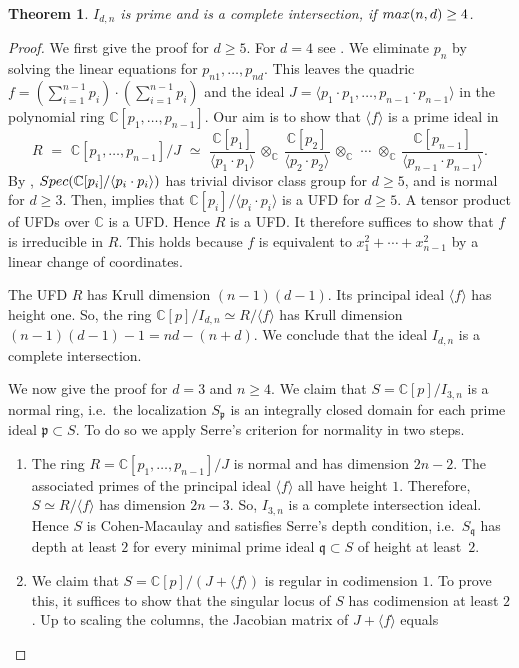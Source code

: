 \documentclass[english]{ourlematema}
\newtheorem{theorem}{Theorem}
\numberwithin{theorem}{section}
\theoremstyle{definition}
\newcommand{\CC}{\mathbb{C}}
\begin{document}
\begin{theorem} \label{thm:parameters}
$I_{d,n}$ is prime and is a complete intersection, if ${\rm max}(n,d) \ge 4$.
\end{theorem}


\begin{proof}
We first give the proof for $d \geq 5$. For $d=4$
see \cite[Theorem 4.5]{EPS}. We eliminate $p_n$ by solving the linear equations for
$p_{n1},\ldots,p_{nd}$. This leaves the quadric 
$f = (\sum_{i=1}^{n-1} p_i) \cdot (\sum_{i=1}^{n-1} p_i)$ and the ideal
$J = \langle p_1 \cdot p_1 ,\ldots, p_{n-1}\cdot p_{n-1}\rangle$
in the polynomial ring $\CC[p_1,\ldots,p_{n-1}]$.
Our aim is to show that  $\langle f \rangle$ is a prime ideal in
$$ R \,\,=\,\, \CC[p_1,\ldots,p_{n-1}]/J \,\, \simeq \,\,
\frac{\CC[p_1]}{\langle p_1\cdot p_1\rangle }\,\otimes_\CC\,  \frac{\CC[p_2]}{\langle p_2\cdot p_2 \rangle}
\,\otimes_\CC\, \,\cdots\, \, \otimes_\CC \,
\frac{\CC[p_{n-1}]}{\langle p_{n-1}\cdot p_{n-1} \rangle}.
$$
By \cite[Exercise II.6.5]{Har}, 
$ {\rm Spec}( \CC[p_i]/\langle p_i \cdot p_i \rangle ) $
has trivial divisor class group  for $d \geq 5$, and  is normal for
 $ d \geq 3$. Then, \cite[Proposition II.6.2]{Har} implies  that
$\CC[p_i]/\langle p_i \cdot p_i \rangle $
 is a UFD for $d \geq 5$.  A tensor product of UFDs over $\CC$ is a UFD. Hence
 $R$ is a UFD. It therefore suffices to show that $f$ is irreducible in $R$.
This holds because  $f$ is equivalent to 
$x_1^2 + \cdots + x_{n-1}^2$ by a linear change of coordinates.

The UFD $R$ has Krull dimension $(n-1)(d-1)$.
Its principal ideal $\langle f \rangle$ has height one.
So, the ring $\CC[p]/I_{d,n} \simeq R/ \langle f \rangle$ has Krull dimension
$(n-1)(d-1)-1 = nd-(n+d)$. 
We conclude that the ideal $I_{d,n}$ is a complete intersection.

We now give the proof for $d = 3$ and $n \ge 4$. 
 We claim that $S = \mathbb{C}[p] /I_{3,n}$ is a normal ring, i.e.~the localization $S_\mathfrak{p}$ is an integrally closed domain
 for each prime ideal $\mathfrak{p} \subset S$. To do so we apply Serre's criterion for normality in two steps.
    
    \begin{enumerate}
        \item  The ring $R = \mathbb{C}[p_1,\dots,p_{n-1}]/J$ is normal and has dimension $2n-2$.       
          The associated primes of   the principal ideal $\langle f \rangle$ all have height $1$. Therefore, $S \simeq R/ \langle f \rangle$ has dimension $2n - 3$. So, $I_{3,n}$ is a complete intersection ideal. Hence $S$ is Cohen-Macaulay and satisfies Serre's depth condition, i.e.~$S_\mathfrak{q}$ has depth at least $2$ for every minimal prime ideal $\mathfrak{q} \subset S$ of height at least~$2$.  
        \item We claim that  $S = \mathbb{C}[p] /(J+\langle f \rangle)$ is regular in codimension $1$. To prove this, it suffices to show that the singular locus of $S$ has codimension at least $2$. 
      Up to scaling the columns,   the Jacobian matrix of $ J+\langle f \rangle$ equals


\end{enumerate}
\end{proof}
\end{document}
